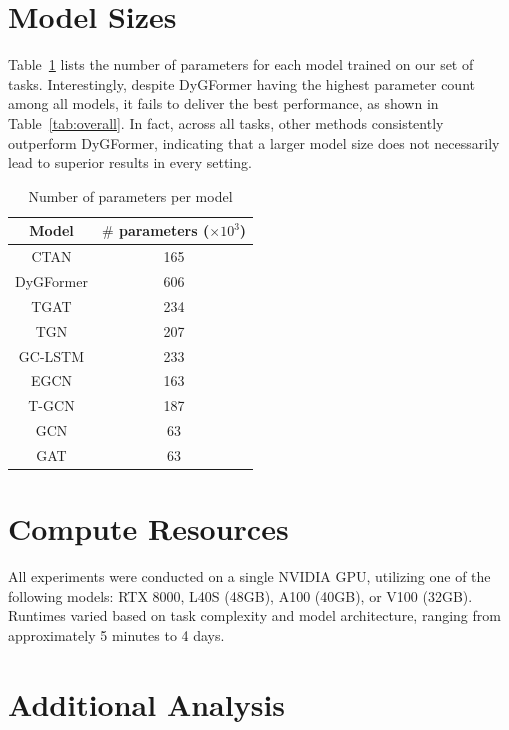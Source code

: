 \section{Model Sizes}\label{appendix:parameters}
Table~\ref{tab:model_num_params} lists the number of parameters for each model trained on our set of tasks. Interestingly, despite DyGFormer having the highest parameter count among all models, it fails to deliver the best performance, as shown in Table~\ref{tab:overall}. In fact, across all tasks, other methods consistently outperform DyGFormer, indicating that a larger model size does not necessarily lead to superior results in every setting.
\begin{table}[h]

    \caption{Number of parameters per model}
    \label{tab:model_num_params}
    \centering
    \begin{tabular}{c|c}
        Model & $\#$ parameters ($\times 10^3$) \\
        \toprule
        CTAN & 165 \\
        DyGFormer & 606 \\
        TGAT & 234 \\
        TGN & 207 \\
        \midrule
        GC-LSTM & 233 \\
        EGCN & 163 \\
        T-GCN & 187 \\
        GCN & 63 \\
        GAT & 63 \\
        \bottomrule
    \end{tabular}
\end{table}


\section{Compute Resources} \label{appendix:compute}
All experiments were conducted on a single NVIDIA GPU, utilizing one of the following models: RTX 8000, L40S (48GB), A100 (40GB), or V100 (32GB). Runtimes varied based on task complexity and model architecture, ranging from approximately 5 minutes to 4 days.
 
\section{Additional Analysis}

